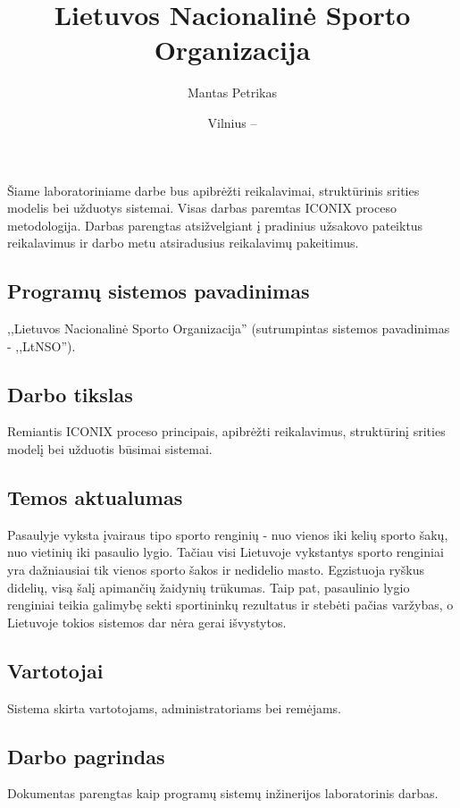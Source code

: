 \documentclass{VUMIFPSkursinis}
\title{Lietuvos Nacionalinė Sporto Organizacija}
\author{Mantas Petrikas}
\date{Vilnius – \the\year}
\begin{document}
    \maketitle
    \tableofcontents
    
     \label{anotacija}
		Šiame laboratoriniame darbe bus apibrėžti reikalavimai, struktūrinis srities modelis bei užduotys sistemai. Visas darbas paremtas ICONIX proceso metodologija.
		Darbas parengtas atsižvelgiant į pradinius užsakovo pateiktus reikalavimus ir darbo metu atsiradusius reikalavimų pakeitimus.
		
     \label{ivadas}	
        \subsection*{Programų sistemos pavadinimas} \label{ivadas_psPavadinimas}
            ,,Lietuvos Nacionalinė Sporto Organizacija'' (sutrumpintas sistemos pavadinimas - ,,LtNSO'').
        \subsection*{Darbo tikslas} \label{ivadas_darboTikslas}
            Remiantis ICONIX proceso principais, apibrėžti reikalavimus, struktūrinį srities modelį bei užduotis būsimai sistemai.
        \subsection*{Temos aktualumas} \label{ivadas_aktualumas}
            Pasaulyje vyksta įvairaus tipo sporto renginių - nuo vienos iki kelių sporto šakų, nuo vietinių iki pasaulio lygio. Tačiau visi Lietuvoje vykstantys sporto renginiai yra dažniausiai tik vienos sporto šakos ir nedidelio masto. Egzistuoja ryškus didelių, visą šalį apimančių žaidynių trūkumas. Taip pat, pasaulinio lygio renginiai teikia galimybę sekti sportininkų rezultatus ir stebėti pačias varžybas, o Lietuvoje tokios sistemos dar nėra gerai išvystytos.
        \subsection*{Vartotojai} \label{ivadas_naudotojai}
            Sistema skirta vartotojams, administratoriams bei remėjams.
        \subsection*{Darbo pagrindas} \label{ivadas_pagrindas}
            Dokumentas parengtas kaip programų sistemų inžinerijos laboratorinis darbas.
			
\end{document}
